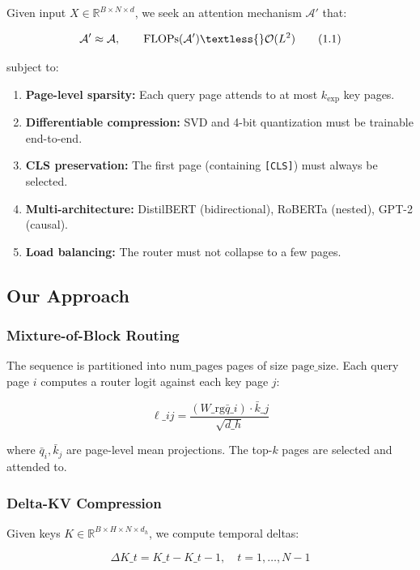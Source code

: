 Given input $X \in \mathbb{R}^{B \times N \times d}$, we seek an attention 
mechanism $\mathcal{A}'$ that:

\[
\mathcal{A}' \approx \mathcal{A}, \qquad
\text{FLOPs}(\mathcal{A}') \textless{} \mathcal{O}(L^2)
\tag{1.1}
\]

subject to:

\begin{enumerate}
\item \textbf{Page-level sparsity:} Each query page attends to at most $k_\text{exp}$
  key pages.
\item \textbf{Differentiable compression:} SVD and 4-bit quantization must be
  trainable end-to-end.
\item \textbf{CLS preservation:} The first page (containing \texttt{[CLS]}) must always be
  selected.
\item \textbf{Multi-architecture:} DistilBERT (bidirectional), RoBERTa (nested),
  GPT-2 (causal).
\item \textbf{Load balancing:} The router must not collapse to a few pages.

\end{enumerate}
\subsection{Our Approach}

\subsubsection{Mixture-of-Block Routing}

The sequence is partitioned into $\text{num\_pages}$ pages of size 
$\text{page\_size}$. Each query page $i$ computes a router logit against 
each key page $j$:

\[
\ell\_{ij} = \frac{(W\_\text{rg} \bar{q}\_i) \cdot \bar{k}\_j}{\sqrt{d\_h}}
\tag{1.2}
\]

where $\bar{q}_i, \bar{k}_j$ are page-level mean projections. The top-$k$ 
pages are selected and attended to.

\subsubsection{Delta-KV Compression}

Given keys $K \in \mathbb{R}^{B \times H \times N \times d_h}$, we compute 
temporal deltas:

\[
\Delta K\_t = K\_t - K\_{t-1}, \quad t = 1, \dots, N-1
\tag{1.3}
\]

